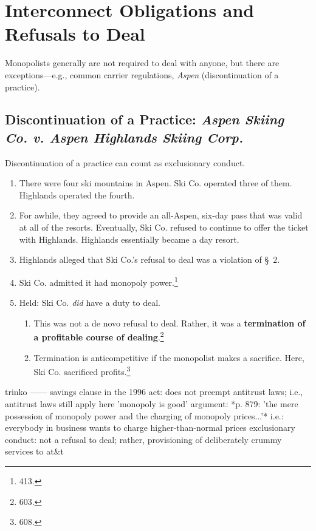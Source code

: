 \section{Interconnect Obligations and Refusals to Deal}

Monopolists generally are not required to deal with anyone, but there are 
exceptions---e.g., common carrier regulations, \emph{Aspen} (discontinuation of 
a practice).

\subsection{Discontinuation of a Practice: \emph{Aspen Skiing Co. v. Aspen 
Highlands Skiing Corp.}}

Discontinuation of a practice can count as exclusionary conduct.

\begin{enumerate}
    \item There were four ski mountains in Aspen. Ski Co. operated three of 
    them. Highlands operated the fourth.
    \item For awhile, they agreed to provide an all-Aspen, six-day pass that 
    was valid at all of the resorts. Eventually, Ski Co. refused to continue to 
    offer the ticket with Highlands. Highlands essentially became a day resort.
    \item Highlands alleged that Ski Co.'s refusal to deal was a violation of 
    \S\ 2.
    \item Ski Co. admitted it had monopoly power.\footnote{413.}
    \item Held: Ski Co. \emph{did} have a duty to deal.
    \begin{enumerate}
        \item This was not a de novo refusal to deal. Rather, it was a 
        \textbf{termination of a profitable course of dealing}.\footnote{603.}
        \item Termination is anticompetitive if the monopolist makes a 
        sacrifice. Here, Ski Co. sacrificed profits.\footnote{608.}
    \end{enumerate}
\end{enumerate}

trinko
------
    savings clause in the 1996 act: does not preempt antitrust laws; i.e., antitrust laws still apply here
    'monopoly is good' argument: *p. 879: 'the mere possession of monopoly power and the charging of monopoly prices...'*
        i.e.: everybody in business wants to charge higher-than-normal prices
    exclusionary conduct: not a refusal to deal; rather, provisioning of deliberately crummy services to at\&t

